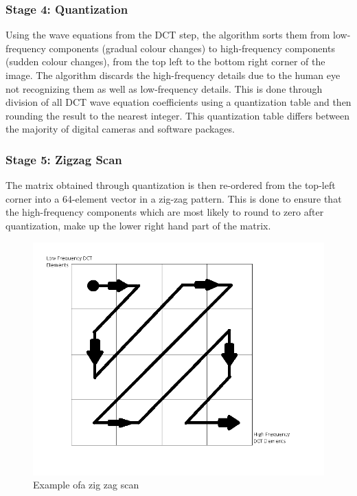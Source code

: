 \subsubsection{Stage 4: Quantization}
Using the wave equations from the DCT step,
the algorithm sorts them from low-frequency
components (gradual colour changes) to 
high-frequency components (sudden colour changes),
from the top left to the bottom right corner of the image.
The algorithm discards the high-frequency details
due to the human eye not recognizing them as
well as low-frequency details. This is done through 
division of all DCT wave equation 
coefficients using a quantization table and
then rounding the result to the nearest integer.
This quantization table differs between
the majority of digital cameras and 
software packages.\cite{hass_impulse_jpeg}

\subsubsection{Stage 5: Zigzag Scan}
The matrix obtained through quantization is
then re-ordered from the top-left corner into a 
64-element vector in a zig-zag pattern.
This is done to ensure that the high-frequency
components which are most likely to round to
zero after quantization, make up the lower
right hand part of the matrix.

\begin{figure}[!hbtp]
\begin{center}
\includegraphics[scale=1]{figures/jpegzigzag.png} 
\end{center}
\caption{Example ofa zig zag scan \cite{hass_impulse_jpeg}}
\end{figure}

